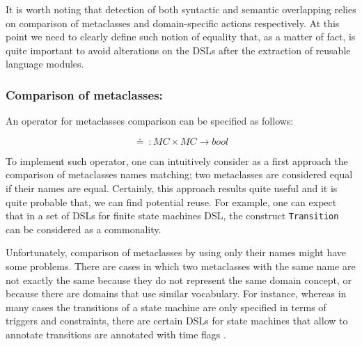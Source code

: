 


It is worth noting that detection of both syntactic and semantic overlapping relies on comparison of metaclasses and domain-specific actions respectively. At this point we need to clearly define such notion of equality that, as a matter of fact, is quite important to avoid alterations on the DSLs after the extraction of reusable language modules.

\vspace{-3mm}
\subsubsection{Comparison of metaclasses:} An operator for metaclasses comparison can be specified as follows: 

\begin{equation}
  \doteq~: MC \times MC \rightarrow bool
\end{equation}

To implement such operator, one can intuitively consider as a first approach the comparison of metaclasses names matching; two metaclasses are considered equal if their names are equal. Certainly, this approach results quite useful and it is quite probable that, we can find potential reuse. For example, one can expect that in a set of DSLs for finite state machines DSL, the construct \texttt{Transition} can be considered as a commonality.

Unfortunately, comparison of metaclasses by using only their names might have some problems. There are cases in which two metaclasses with the same name are not exactly the same because they do not represent the same domain concept, or because there are domains that use similar vocabulary. For instance, whereas in many cases the transitions of a state machine are only specified in terms of triggers and constraints, there are certain DSLs for state machines that allow to annotate transitions are annotated with time flags \cite{Graf:2007}.

